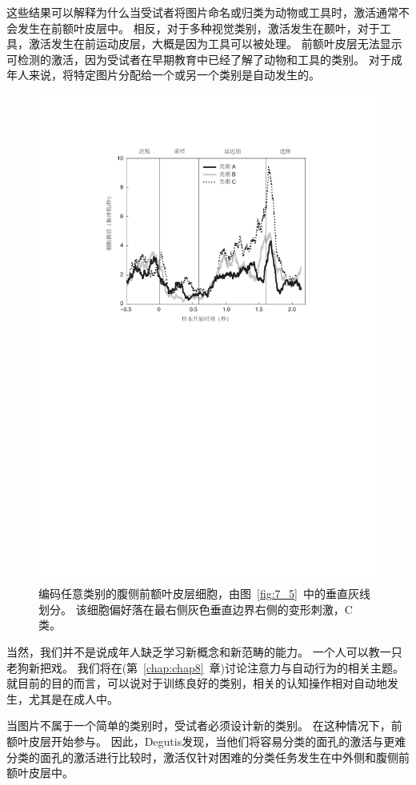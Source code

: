 这些结果可以解释为什么当受试者将图片命名或归类为动物或工具时，激活通常不会发生在前额叶皮层中\cite{martin2007representation}。
相反，对于多种视觉类别，激活发生在颞叶，对于工具，激活发生在前运动皮层，大概是因为工具可以被处理。
前额叶皮层无法显示可检测的激活，因为受试者在早期教育中已经了解了动物和工具的类别。
对于成年人来说，将特定图片分配给一个或另一个类别是自动发生的。


\begin{figure}
	\centering
	\includegraphics[width=0.62\linewidth]{chap7/7_7}
	\caption{编码任意类别的腹侧前额叶皮层细胞，由图~\ref{fig:7_5}~中的垂直灰线划分。
		该细胞偏好落在最右侧灰色垂直边界右侧的变形刺激，C 类\cite{freedman2002visual}。\label{fig:7_7}}
\end{figure}
\par


当然，我们并不是说成年人缺乏学习新概念和新范畴的能力。 
一个人可以教一只老狗新把戏。 
我们将在(第~\ref{chap:chap8}~章)讨论注意力与自动行为的相关主题。
就目前的目的而言，可以说对于训练良好的类别，相关的认知操作相对自动地发生，尤其是在成人中。
\par


当图片不属于一个简单的类别时，受试者必须设计新的类别。 
在这种情况下，前额叶皮层开始参与。 
因此，Degutis\cite{degutis2007distinct}发现，当他们将容易分类的面孔的激活与更难分类的面孔的激活进行比较时，激活仅针对困难的分类任务发生在中外侧和腹侧前额叶皮层中。


